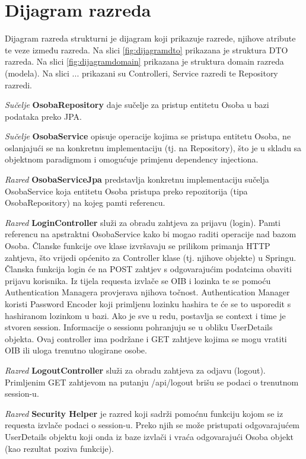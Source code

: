 			\eject
			
			
		\section{Dijagram razreda}
			
			Dijagram razreda strukturni je dijagram koji prikazuje razrede, njihove atribute te veze između razreda. Na slici \ref{fig:dijagramdto} prikazana je struktura DTO razreda. Na slici \ref{fig:dijagramdomain} prikazana je struktura domain razreda (modela). Na slici ... prikazani su Controlleri, Service razredi te Repository razredi.
			

			\textit{Sučelje }\textbf{OsobaRepository}
			 daje sučelje za pristup entitetu Osoba u bazi podataka preko JPA.

			\textit{Sučelje }\textbf{OsobaService}
			 opisuje operacije kojima se pristupa entitetu Osoba, 
			ne oslanjajući se na konkretnu implementaciju (tj. na Repository),
			što je u skladu sa objektnom paradigmom i omogućuje primjenu dependency injectiona.
			
			\textit{Razred }\textbf{OsobaServiceJpa}
			 predstavlja konkretnu implementaciju sučelja OsobaService koja entitetu Osoba
			pristupa preko repozitorija (tipa OsobaRepository) na kojeg pamti referencu.

			\textit{Razred }\textbf{LoginController}
			 služi za obradu zahtjeva za prijavu (login).
			Pamti referencu na apstraktni OsobaService kako bi mogao raditi operacije nad bazom Osoba.
			Članske funkcije 
			ove klase izvršavaju se prilikom primanja HTTP zahtjeva, što vrijedi općenito za Controller klase
			(tj. njihove objekte) u Springu. Članska funkcija login će na POST zahtjev s odgovarajućim podatcima
			obaviti prijavu korisnika. 
			Iz tijela requesta izvlače se OIB i lozinka te se pomoću Authentication Managera provjerava njihova točnost. Authentication Manager koristi Password Encoder koji primljenu lozinku hashira te će se to usporedit s hashiranom lozinkom u bazi. Ako je sve u redu, postavlja se context i time je stvoren session. Informacije o sessionu pohranjuju se u obliku UserDetails objekta. Ovaj controller ima podržane i GET zahtjeve kojima se mogu vratiti OIB ili uloga trenutno ulogirane osobe.
			
			\textit{Razred }\textbf{LogoutController} služi za obradu zahtjeva za odjavu (logout). Primljenim GET zahtjevom na putanju /api/logout brišu se podaci o trenutnom session-u.
			
			\textit{Razred }\textbf{Security Helper} je razred koji sadrži pomoćnu funkciju kojom se iz requesta izvlače podaci o session-u. Preko njih se može pristupati odgovarajućem UserDetails objektu koji onda iz baze izvlači i vraća odgovarajući Osoba objekt (kao rezultat poziva funkcije).

